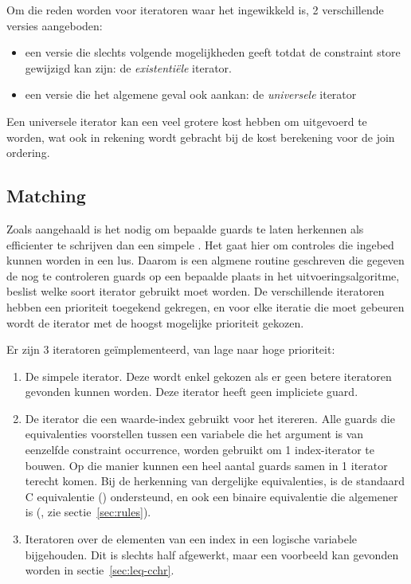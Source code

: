 Om die reden worden voor iteratoren waar het ingewikkeld is, 2 verschillende versies aangeboden: \begin{itemize}
\item een versie die slechts volgende mogelijkheden geeft totdat de constraint store gewijzigd kan zijn: de {\em existenti\"ele} iterator.
\item een versie die het algemene geval ook aankan: de {\em universele} iterator
\end{itemize}

Een universele iterator kan een veel grotere kost hebben om uitgevoerd te worden, wat ook in rekening wordt gebracht bij de kost berekening voor de join ordering.

\subsection{Matching} \label{sec:matching}

Zoals aangehaald is het nodig om bepaalde guards te laten herkennen als efficienter te schrijven dan een simpele . Het gaat hier om controles die ingebed kunnen worden in een lus. Daarom is een algmene routine geschreven die gegeven de nog te controleren guards op een bepaalde plaats in het uitvoeringsalgoritme, beslist welke soort iterator gebruikt moet worden. De verschillende iteratoren hebben een prioriteit toegekend gekregen, en voor elke iteratie die moet gebeuren wordt de iterator met de hoogst mogelijke prioriteit gekozen.

Er zijn 3 iteratoren ge\"implementeerd, van lage naar hoge prioriteit: \begin{enumerate}
\item De simpele  iterator. Deze wordt enkel gekozen als er geen betere iteratoren gevonden kunnen worden. Deze iterator heeft geen impliciete guard.
\item De  iterator die een waarde-index gebruikt voor het itereren. Alle guards die equivalenties voorstellen tussen een variabele die het argument is van eenzelfde constraint occurrence, worden gebruikt om 1 index-iterator te bouwen. Op die manier kunnen een heel aantal guards samen in 1 iterator terecht komen. Bij de herkenning van dergelijke equivalenties, is de standaard C equivalentie (\code{==}) ondersteund, en ook een binaire equivalentie die algemener is (, zie sectie~\ref{sec:rules}).
\item Iteratoren over de elementen van een index in een logische variabele bijgehouden. Dit is slechts half afgewerkt, maar een voorbeeld kan gevonden worden in sectie~\ref{sec:leq-cchr}.
\end{enumerate}

